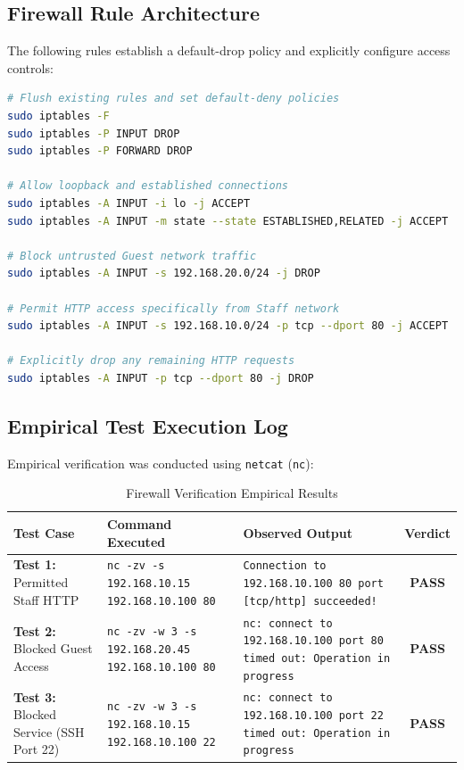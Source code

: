 \documentclass[12pt,a4paper]{article}
\begin{document}
\subsection{Firewall Rule Architecture}
The following rules establish a default-drop policy and explicitly configure access controls:

\begin{lstlisting}[language=bash, caption={iptables Rules Configuration}]
# Flush existing rules and set default-deny policies
sudo iptables -F
sudo iptables -P INPUT DROP
sudo iptables -P FORWARD DROP

# Allow loopback and established connections
sudo iptables -A INPUT -i lo -j ACCEPT
sudo iptables -A INPUT -m state --state ESTABLISHED,RELATED -j ACCEPT

# Block untrusted Guest network traffic
sudo iptables -A INPUT -s 192.168.20.0/24 -j DROP

# Permit HTTP access specifically from Staff network
sudo iptables -A INPUT -s 192.168.10.0/24 -p tcp --dport 80 -j ACCEPT

# Explicitly drop any remaining HTTP requests
sudo iptables -A INPUT -p tcp --dport 80 -j DROP
\end{lstlisting}

\subsection{Empirical Test Execution Log}

Empirical verification was conducted using \texttt{netcat} (\texttt{nc}):

\begin{table}[htbp]
\centering
\caption{Firewall Verification Empirical Results}
\vspace{0.1cm}
\small
\begin{tabular}{@{}p{2.2cm} p{4.2cm} p{4.6cm} c@{}}
\toprule
\textbf{Test Case} & \textbf{Command Executed} & \textbf{Observed Output} & \textbf{Verdict} \\ \midrule
\textbf{Test 1:} Permitted Staff HTTP & \texttt{nc -zv -s 192.168.10.15 192.168.10.100 80} & \texttt{Connection to 192.168.10.100 80 port [tcp/http] succeeded!} & \textbf{PASS} \\ \midrule
\textbf{Test 2:} Blocked Guest Access & \texttt{nc -zv -w 3 -s 192.168.20.45 192.168.10.100 80} & \texttt{nc: connect to 192.168.10.100 port 80 timed out: Operation in progress} & \textbf{PASS} \\ \midrule
\textbf{Test 3:} Blocked Service (SSH Port 22) & \texttt{nc -zv -w 3 -s 192.168.10.15 192.168.10.100 22} & \texttt{nc: connect to 192.168.10.100 port 22 timed out: Operation in progress} & \textbf{PASS} \\ \bottomrule
\end{tabular}
\end{table}
\end{document}
